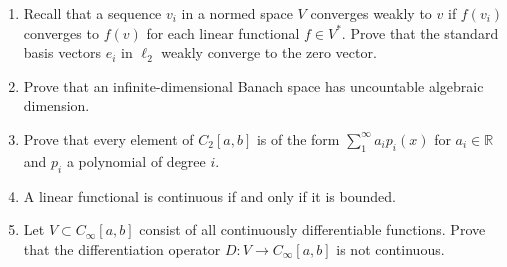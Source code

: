 \documentclass[12pt,letterpaper,reqno]{amsart}
\newcommand{\R}{\mathbb R}
\begin{document}
\begin{enumerate}[1.]
\item Recall that a sequence $v_i$ in a normed space $V$ converges weakly to $v$ if $f(v_i)$ converges to $f(v)$ for each linear functional $f\in V^*$. Prove that the standard basis vectors $e_i$ in $\ell_2$ weakly converge to the zero vector.
\item Prove that an infinite-dimensional Banach space has uncountable algebraic dimension.
\item Prove that every element of $C_2[a,b]$ is of the form $\sum_1^\infty a_ip_i(x)$ for $a_i\in \R$ and $p_i$ a polynomial of degree $i$.
\item A linear functional is continuous if and only if it is bounded.
\item Let $V\subset C_\infty[a,b]$ consist of all continuously differentiable functions. Prove that the differentiation operator $D:V\rightarrow C_\infty[a,b]$ is not continuous.
\end{enumerate}
\newpage
\end{document}
